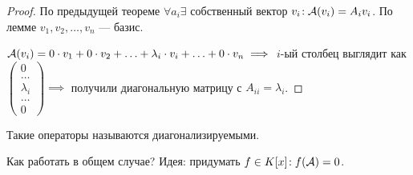 \begin{proof}
    По предыдущей теореме $\forall a_i \exists $ собственный  вектор  $v_i\!: \mathcal{A}(v_i) = A_iv_i$. По лемме  $v_1, v_2, \ldots, v_n$ --- базис. 

    $\mathcal{A}(v_i) = 0 \cdot v_1 + 0 \cdot v_2 + \ldots + \lambda_i \cdot v_i + \ldots + 0 \cdot v_n \implies$ $i$-ый столбец выглядит как $\begin{pmatrix} 0 \\ \ldots \\ \lambda_i \\ \ldots \\ 0 \end{pmatrix} \implies$ получили диагональную матрицу с $A_{ii} = \lambda_i$.
\end{proof}
\begin{definition}
    Такие операторы называются диагонализируемыми.
\end{definition}
Как работать в общем случае? Идея: придумать $f \in K[x]\!: f(\mathcal{A}) = 0$.

